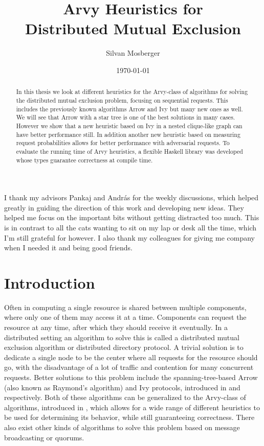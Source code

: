 \documentclass[a4paper, oneside]{discothesis}
\title{Arvy Heuristics for \\Distributed Mutual Exclusion}
\author{Silvan Mosberger}
\institute{Distributed Computing Group \\[2pt]
Computer Engineering and Networks Laboratory \\[2pt]
ETH Zürich}
\date{\today}
\begin{document}
\frontmatter
\maketitle

\cleardoublepage

\begin{acknowledgements}
I thank my advisors Pankaj and András for the weekly discussions, which helped greatly in guiding the direction of this work and developing new ideas. They helped me focus on the important bits without getting distracted too much. This is in contrast to all the cats wanting to sit on my lap or desk all the time, which I'm still grateful for however. I also thank my colleagues for giving me company when I needed it and being good friends.
\end{acknowledgements}


\begin{abstract}
In this thesis we look at different heuristics for the Arvy-class of algorithms for solving the distributed mutual exclusion problem, focusing on sequential requests. This includes the previously known algorithms Arrow and Ivy but many new ones as well. We will see that Arrow with a star tree is one of the best solutions in many cases. However we show that a new heuristic based on Ivy in a nested clique-like graph can have better performance still. In addition another new heuristic based on measuring request probabilities allows for better performance with adversarial requests. To evaluate the running time of Arvy heuristics, a flexible Haskell library was developed whose types guarantee correctness at compile time.
\end{abstract}

\tableofcontents

\mainmatter

\chapter{Introduction}

Often in computing a single resource is shared between multiple components, where only one of them may access it at a time. Components can request the resource at any time, after which they should receive it eventually. In a distributed setting an algorithm to solve this is called a distributed mutual exclusion algorithm or distributed directory protocol. A trivial solution is to dedicate a single node to be the center where all requests for the resource should go, with the disadvantage of a lot of traffic and contention for many concurrent requests. Better solutions to this problem include the spanning-tree-based Arrow (also known as Raymond's algorithm) and Ivy protocols, introduced in \cite{Ray} and \cite{Ivy} respectively. Both of these algorithms can be generalized to the Arvy-class of algorithms, introduced in \cite{Arvy}, which allows for a wide range of different heuristics to be used for determining its behavior, while still guaranteeing correctness. There also exist other kinds of algorithms to solve this problem based on message broadcasting or quorums.
\end{document}
